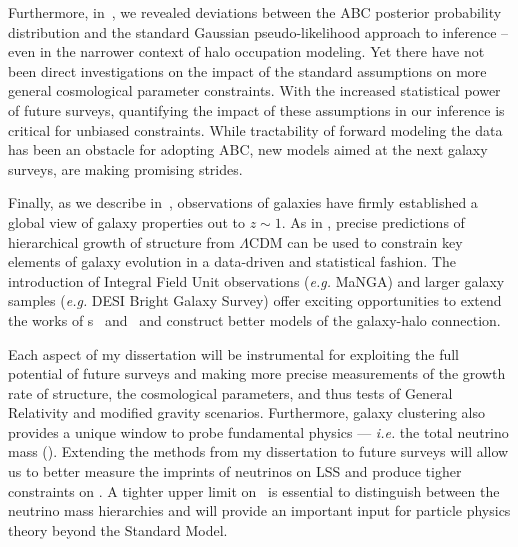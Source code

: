 Furthermore, in~, we revealed deviations between the ABC posterior 
probability distribution and the standard Gaussian pseudo-likelihood approach to 
inference -- even in the narrower context of halo occupation modeling. Yet 
there have not been direct investigations on the impact of the standard 
assumptions on more general cosmological parameter constraints. With the 
increased statistical power of future surveys, quantifying the impact of these 
assumptions in our inference is critical for unbiased constraints. While
tractability of forward modeling the data has been an obstacle for adopting 
ABC, new models aimed at the next galaxy surveys, are making promising 
strides. 

Finally, as we describe in~, observations of galaxies have 
firmly established a global view of galaxy properties out to $z{\sim}1$. 
As in , precise predictions of hierarchical growth of 
structure from $\Lambda$CDM can be used to constrain key elements of 
galaxy evolution in a data-driven and statistical fashion. The introduction 
of Integral Field Unit observations (\emph{e.g.} MaNGA) and larger 
galaxy samples (\emph{e.g.} DESI Bright Galaxy Survey) offer exciting 
opportunities to extend the works of \chapname s~ and~
and construct better models of the galaxy-halo connection.

Each aspect of my dissertation will be instrumental for exploiting the full 
potential of future surveys and making more precise measurements of the growth
rate of structure, the cosmological parameters, and thus tests of General Relativity 
and modified gravity scenarios. 
Furthermore, galaxy clustering also provides a unique window to probe 
fundamental physics --- {\em i.e.} the total neutrino mass (\mneut).
Extending the methods from my dissertation to future surveys will allow 
us to better measure the imprints of neutrinos on LSS and produce 
tigher constraints on \mneut. A tighter 
upper limit on \mneut ~is essential to distinguish between the neutrino mass 
hierarchies and will provide an important input for particle physics theory 
beyond the Standard Model.
